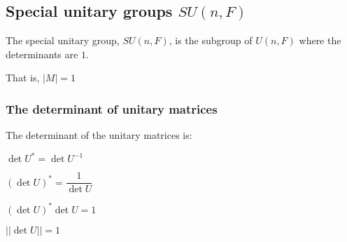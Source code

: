 
\subsection{Special unitary groups \(SU(n, F)\)}

The special unitary group, \(SU(n,F)\), is the subgroup of \(U(n,F)\) where the determinants are \(1\).

That is, \(|M|=1\)

\subsubsection{The determinant of unitary matrices}

The determinant of the unitary matrices is:

\(\det U^*=\det U^{-1}\)

\((\det U)^*=\dfrac{1}{\det U} \)

\((\det U)^*\det U = 1 \)

\(||\det U||= 1\)

